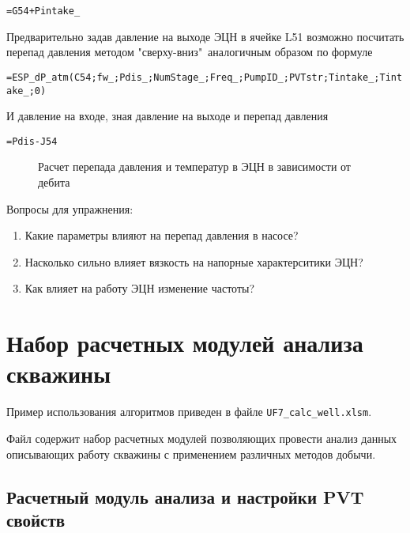 { \small  \texttt{=G54+Pintake\_}}

Предварительно задав давление на выходе ЭЦН в ячейке L51 возможно посчитать перепад давления методом "сверху-вниз"\ аналогичным образом по формуле

{ \small  \texttt{=ESP\_dP\_atm(C54;fw\_;Pdis\_;NumStage\_;Freq\_;PumpID\_;PVTstr;Tintake\_;Tintake\_;0)}}

И давление на входе, зная давление на выходе и перепад давления

{ \small  \texttt{=Pdis-J54}}

\begin{figure}[h!]
	\center{\texttt{[image: Ex70\_4]}}
	\caption{Расчет перепада давления и температур в ЭЦН в зависимости от дебита}
	\label{ris:Ex70_4}
\end{figure}

Вопросы для упражнения:

\begin{enumerate}
	\item Какие параметры влияют на перепад давления в насосе?
	\item Насколько сильно влияет вязкость на напорные характерситики ЭЦН?
	\item Как влияет на работу ЭЦН изменение частоты?
\end{enumerate}





\section{Набор расчетных модулей анализа скважины}
Пример использования алгоритмов \unf   приведен в файле \texttt{UF7\_calc\_well.xlsm}.

Файл содержит набор расчетных модулей позволяющих провести анализ данных описывающих работу скважины с применением различных методов добычи.

\subsection{Расчетный модуль анализа и настройки PVT свойств}

